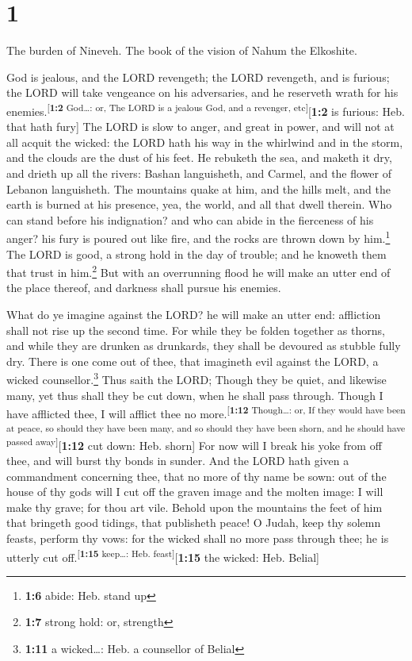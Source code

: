 \hypertarget{section}{%
\section{1}\label{section}}

 The burden of Nineveh. The book of the vision of Nahum
the Elkoshite.

 God is jealous, and the LORD revengeth; the LORD
revengeth, and is furious; the LORD will take vengeance on his
adversaries, and he reserveth wrath for his
enemies.\textsuperscript{{[}\textbf{1:2} God\ldots: or, The LORD is a
jealous God, and a revenger, etc{]}}{[}\textbf{1:2} is furious: Heb.
that hath fury{]}  The LORD is slow to anger, and great in
power, and will not at all acquit the wicked: the LORD hath his way in
the whirlwind and in the storm, and the clouds are the dust of his feet.
 He rebuketh the sea, and maketh it dry, and drieth up all
the rivers: Bashan languisheth, and Carmel, and the flower of Lebanon
languisheth.  The mountains quake at him, and the hills
melt, and the earth is burned at his presence, yea, the world, and all
that dwell therein.  Who can stand before his indignation?
and who can abide in the fierceness of his anger? his fury is poured out
like fire, and the rocks are thrown down by him.\footnote{\textbf{1:6}
  abide: Heb. stand up}  The LORD is good, a strong hold
in the day of trouble; and he knoweth them that trust in him.\footnote{\textbf{1:7}
  strong hold: or, strength}  But with an overrunning
flood he will make an utter end of the place thereof, and darkness shall
pursue his enemies.

 What do ye imagine against the LORD? he will make an
utter end: affliction shall not rise up the second time. 
For while they be folden together as thorns, and while they are drunken
as drunkards, they shall be devoured as stubble fully dry.
 There is one come out of thee, that imagineth evil
against the LORD, a wicked counsellor.\footnote{\textbf{1:11} a
  wicked\ldots: Heb. a counsellor of Belial}  Thus saith
the LORD; Though they be quiet, and likewise many, yet thus shall they
be cut down, when he shall pass through. Though I have afflicted thee, I
will afflict thee no more.\textsuperscript{{[}\textbf{1:12}
Though\ldots: or, If they would have been at peace, so should they have
been many, and so should they have been shorn, and he should have passed
away{]}}{[}\textbf{1:12} cut down: Heb. shorn{]}  For now
will I break his yoke from off thee, and will burst thy bonds in sunder.
 And the LORD hath given a commandment concerning thee,
that no more of thy name be sown: out of the house of thy gods will I
cut off the graven image and the molten image: I will make thy grave;
for thou art vile.  Behold upon the mountains the feet of
him that bringeth good tidings, that publisheth peace! O Judah, keep thy
solemn feasts, perform thy vows: for the wicked shall no more pass
through thee; he is utterly cut off.\textsuperscript{{[}\textbf{1:15}
keep\ldots: Heb. feast{]}}{[}\textbf{1:15} the wicked: Heb. Belial{]}

